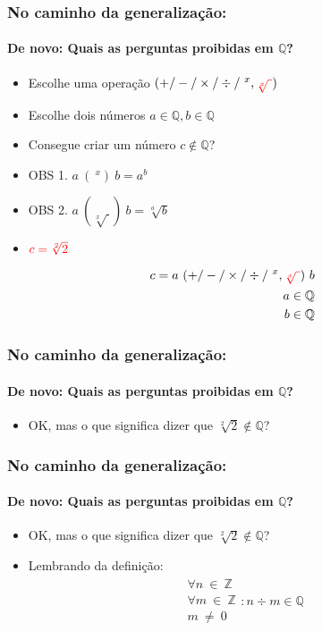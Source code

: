 \documentclass[usenames,dvipsnames,svgnames]{beamer}
\begin{document}
\begin{frame}
	
	\frametitle{No caminho da generalização:}
	\framesubtitle{De novo: Quais as perguntas proibidas em $\mathbb{Q}$?}

	\begin{itemize}
		\item Escolhe uma operação $(+ / - / \times / \div / ~^x, {\color{red}\sqrt[x]{~}})$
		\item Escolhe dois números $a \in \mathbb{Q}, b \in \mathbb{Q}$
		\item Consegue criar um número $c \not \in \mathbb{Q}$?
		\item OBS 1. $a ~(~^x)~ b = a^b$
		\item OBS 2. $a ~(\sqrt[x]{~})~ b = \sqrt[a]{b}$
		\item ${\color{red}c = \sqrt[2]{2}}$
	\end{itemize}

	\begin{equation}
	\begin{aligned}
		c = a ~ (+ / - / \times / \div / ~^x, {\color{red}\sqrt[x]{~}}) ~ b \\
		a \in \mathbb{Q} \\
		b \in \mathbb{Q}
	\end{aligned}
	\end{equation}

\end{frame}

\begin{frame}
	
	\frametitle{No caminho da generalização:}
	\framesubtitle{De novo: Quais as perguntas proibidas em $\mathbb{Q}$?}

	\begin{itemize}
		\item OK, mas o que significa dizer que $\sqrt[2]{2} \not\in \mathbb{Q}$?
	\end{itemize}

\end{frame}

\begin{frame}
	
	\frametitle{No caminho da generalização:}
	\framesubtitle{De novo: Quais as perguntas proibidas em $\mathbb{Q}$?}

	\begin{itemize}
		\item OK, mas o que significa dizer que $\sqrt[2]{2} \not\in \mathbb{Q}$?
		\item Lembrando da definição:
		\begin{equation}
		\begin{aligned}
			\substack{\forall n ~\in~ \mathbb{Z} \\ \forall m ~\in~ \mathbb{Z} \\ m ~\neq~ 0}: n \div m \in \mathbb{Q}
		\end{aligned}
		\end{equation}
	\end{itemize}

\end{frame}
\end{document}
